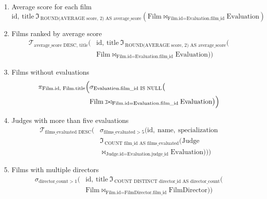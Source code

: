 \documentclass[12pt]{article}
\def\ojoin{%
  \rule[-.02ex]{.25em}{.4pt}\llap{\rule[.45em]{.25em}{.4pt}}}
\def\leftouterjoin{\mathbin{\ojoin\mkern-5.8mu\bowtie}}
\begin{document}
\begin{enumerate}
\item Average score for each film
$$
\text{id},\ \text{title}\ 
\Im_{\ \text{ROUND(AVERAGE score, 2) 
AS average\_score}}
\left(
  \text{Film}
  \Join_{\text{Film.id} = 
  \text{Evaluation.film\_id}} 
  \text{Evaluation}
\right)
$$

\item Films ranked by average score
$$
\begin{aligned}
  \mathcal{T}_{\text{average\_score DESC, title}}
  \Big(
    &\text{id},\ 
    \text{title}\ 
    \Im_{\ \text{ROUND(AVERAGE score, 2) 
    AS average\_score}}
    \Big(\\
      &\text{Film}
      \Join_{\text{Film.id} = 
      \text{Evaluation.film\_id}}
      \text{Evaluation}
    \Big)
  \Big)
\end{aligned}
$$

\item Films without evaluations
$$
\begin{aligned}
  \pi_{\text{Film.id, Film.title}}
  \Big(
    &\sigma_{\text{Evaluation.film\_id IS NULL}}
    \big(\\
      &\text{Film}
      \leftouterjoin_{\text{Film.id} = 
      \text{Evaluation.film\_id}}
      \text{Evaluation}
    \big)
  \Big)
\end{aligned}
$$

\item Judges with more than five evaluations
$$
\begin{aligned}
  \mathcal{T}_{\text{films\_evaluated DESC}}
  \Big(
    &\sigma_{\text{films\_evaluated} > 5}
    \Big(
      \text{id},\ \text{name},\ \text{specialization}\\
      &\Im_{\ \text{COUNT film\_id 
      AS films\_evaluated}}
      \Big(
        \text{Judge}\\
        &\Join_{\text{Judge.id} = 
        \text{Evaluation.judge\_id}}
        \text{Evaluation}
      \Big)
    \Big)
  \Big)
\end{aligned}
$$

\item Films with multiple directors
$$
  \begin{aligned}
  \sigma_{\text{director\_count}>1}
  \Big(
    &\text{id},\ \text{title}\ 
    \Im_{\ \text{COUNT DISTINCT director\_id 
    AS director\_count}}
    \Big(\\
      &\text{Film}
      \Join_{\text{Film.id} = 
      \text{FilmDirector.film\_id}}
      \text{FilmDirector}
    \Big)
  \Big)
\end{aligned}
$$


\end{enumerate}
\end{document}
